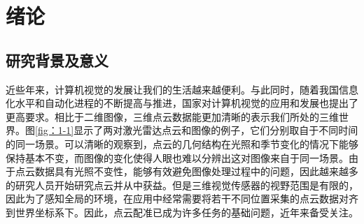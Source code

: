 \chapter{绪论}
\thispagestyle{others}
\pagestyle{others}
\xiaosi

\section{研究背景及意义}
近些年来，计算机视觉的发展让我们的生活越来越便利。与此同时，随着我国信息化水平和自动化进程的不断提高与推进，国家对计算机视觉的应用和发展也提出了更高要求。相比于二维图像，三维点云数据能更加清晰的表示我们所处的三维世界。图\ref*{fig：1-1}显示了两对激光雷达点云和图像的例子，它们分别取自于不同时间的同一场景。可以清晰的观察到，点云的几何结构在光照和季节变化的情况下能够保持基本不变，而图像的变化使得人眼也难以分辨出这对图像来自于同一场景。由于点云数据具有光照不变性，能够有效避免图像处理过程中的问题，因此越来越多的研究人员开始研究点云并从中获益。但是三维视觉传感器的视野范围是有限的，因此为了感知全局的环境，在应用中经常需要将若干不同位置采集的点云数据对齐到世界坐标系下。因此，点云配准已成为许多任务的基础问题，近年来备受关注。


